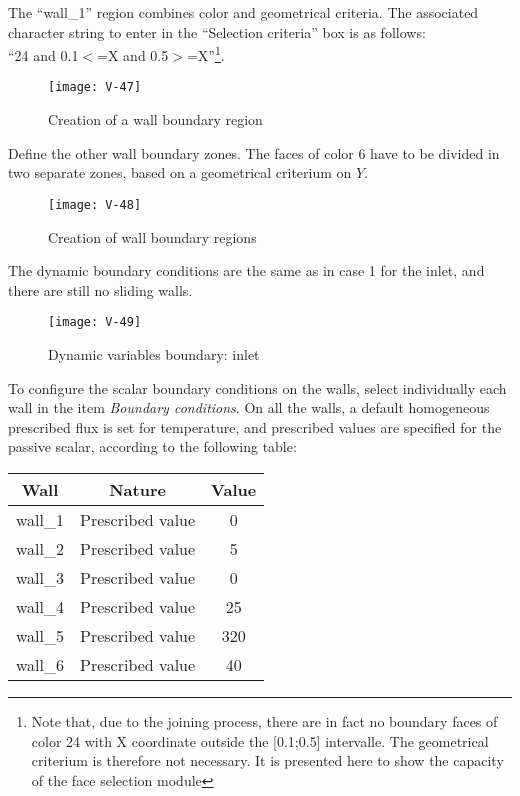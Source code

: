 The ``wall\_1'' region combines color and geometrical criteria. The associated
character string to enter in the ``Selection criteria'' box is as follows:\\
``24 and 0.1$<$=X and 0.5$>$=X''\footnote{Note that, due to the joining process,
there are in fact no boundary faces of color 24 with X coordinate outside the
[0.1;0.5] intervalle. The geometrical criterium is therefore not
necessary. It is presented here to show the capacity of the face selection
module}.

\begin{figure}[h!]
\begin{center}
\texttt{[image: V-47]}
\caption{Creation of a wall boundary region}
\label{fig11_e2}
\end{center}
\end{figure}


\newpage
Define the other wall boundary zones. The faces of color 6 have to be divided in
two separate zones, based on a geometrical criterium on $Y$.

\begin{figure}[h!]
\begin{center}
\texttt{[image: V-48]}
\caption{Creation of wall boundary regions}
\label{fig152_e2}
\end{center}
\end{figure}


\newpage
The dynamic boundary conditions are the same as in case 1 for the inlet, and
there are still no sliding walls.


\begin{figure}[h!]
\begin{center}
\texttt{[image: V-49]}
\caption{Dynamic variables boundary: inlet}
\label{fig16_e2}
\end{center}
\end{figure}


\newpage
To configure the scalar boundary conditions on the walls, select individually each wall in the item {\itshape Boundary conditions}.
On all the walls, a default homogeneous prescribed flux is set for
temperature, and prescribed values are specified for the passive scalar,
according to the following table:
\begin{center}
\begin{tabular}{|c|c|c|}
\hline
Wall & Nature & Value \\
\hline
wall\_1 & Prescribed value  & 0 \\
\hline
wall\_2 & Prescribed value  & 5 \\
\hline
wall\_3 & Prescribed value  & 0 \\
\hline
wall\_4 & Prescribed value  & 25 \\
\hline
wall\_5 & Prescribed value  & 320 \\
\hline
wall\_6 & Prescribed value  & 40 \\
\hline
\end{tabular}
\end{center}

